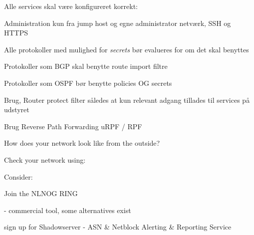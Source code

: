 \documentclass[Screen16to9,17pt]{foils}
\begin{document}
\begin{list1}
\item Alle services skal være konfigureret korrekt:
\begin{list2}
\item Administration kun fra jump host og egne administrator netværk, SSH og HTTPS
\item Alle protokoller med mulighed for \emph{secrets} bør evalueres for om det skal benyttes
\item Protokoller som BGP skal benytte route import filtre
\item Protokoller som OSPF bør benytte policies OG secrets
\item Brug, Router protect filter således at kun relevant adgang tillades til services på udstyret
\item Brug Reverse Path Forwarding uRPF / RPF
\end{list2}
\end{list1}




\begin{list1}
\item How does your network look like from the outside?
\item Check your network using:
\item {}
\item Consider:
\begin{list2}
  \item Join the NLNOG RING 
\item {} - commercial tool, some alternatives exist
\item {} sign up for Shadowserver - ASN \& Netblock Alerting \& Reporting Service
\end{list2}
\end{list1}
\end{document}
